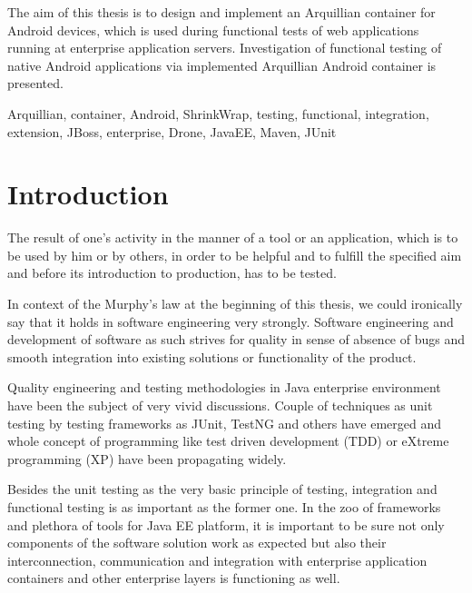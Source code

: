 \documentclass[12pt,final,oneside]{fithesis}
\begin{document}
\begin{ThesisAbstract}
The aim of this thesis is to design and implement an Arquillian container for Android devices, which is used during functional tests of web applications running at enterprise application servers. Investigation of functional testing of native Android applications via implemented Arquillian Android container is presented.
\end{ThesisAbstract}

\begin{ThesisKeyWords}
Arquillian, container, Android, ShrinkWrap, testing, functional, integration, extension, JBoss, enterprise, Drone, JavaEE, Maven, JUnit
\end{ThesisKeyWords}

\clearpage
\thispagestyle{plain}
\par{}

\MainMatter
\tableofcontents

\chapter{Introduction}
The result of one's activity in the manner of a tool or an application, which is to be used by him or by others, in order to be helpful and to fulfill the specified aim and before its introduction to production, has to be tested.

In context of the Murphy's law at the beginning of this thesis, we could ironically say that it holds in software engineering very strongly. Software engineering and development of software as such strives for quality in sense of absence of bugs and smooth integration into existing solutions or functionality of the product.

Quality engineering and testing methodologies in Java enterprise environment have been the subject of very vivid discussions. Couple of techniques as unit testing by testing frameworks as JUnit, TestNG and others have emerged and whole concept of programming like test driven development (TDD) or eXtreme programming (XP) have been propagating widely.

Besides the unit testing as the very basic principle of testing, integration and functional testing is as important as the former one. In the zoo of frameworks and plethora of tools for Java EE platform, it is important to be sure not only components of the software solution work as expected but also their interconnection, communication and integration with enterprise application containers and other enterprise layers is functioning as well.
\end{document}

